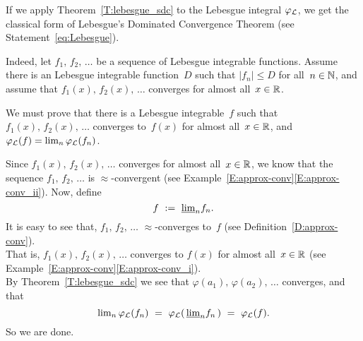 \documentclass[main.tex]{subfiles}
\begin{document}
%
%
\begin{ex}
\label{E:lebesgue}
If we apply Theorem~\ref{T:lebesgue_sdc}
to the Lebesgue integral $\varphi_{\mathcal{L}}$,
we get the classical form of 
Lebesgue's Dominated Convergence Theorem
(see Statement~\eqref{eq:Lebesgue}).

Indeed,
let $f_1,\,f_2,\,\dotsc$ be a sequence of Lebesgue integrable functions.
Assume there is an Lebesgue integrable function~$D$ such that
$|f_n|\leq D$ for all~$n\in\mathbb{N}$,
and assume that $f_1(x),\,f_2(x),\,\dotsc$ converges
for almost all~$x\in\mathbb{R}$.

We must prove that there is a Lebesgue integrable~$f$
such that $f_1(x),\,f_2(x),\,\dotsc$
converges to~$f(x)$ for almost all~$x\in\mathbb{R}$,
and $\varphi_{\mathcal{L}}(f) = \lim_n \varphi_{\mathcal{L}}(f_n)$.

Since 
$f_1(x),\,f_2(x),\,\dotsc$ 
converges for almost all~$x\in \mathbb{R}$,
we know that the sequence $f_1,\,f_2,\,\dotsc$
is $\approx$-convergent
(see Example~\ref{E:approx-conv}\ref{E:approx-conv_ii}).
Now, define
\begin{equation*}
f\ :=\  \smash{\underline{\lim}_{n}}{f_n}.
\end{equation*}
It is easy to see that,
$f_1,\,f_2,\,\dotsc$
$\approx$-converges to~$f$
(see Definition~\ref{D:approx-conv}).\\
That is,
$f_1(x),\,f_2(x),\,\dotsc$
converges to $f(x)$ for almost all~$x\in\mathbb{R}$
(see Example~\ref{E:approx-conv}\ref{E:approx-conv_i}).\\
By Theorem~\ref{T:lebesgue_sdc}
we see that $\varphi(a_1),\,\varphi(a_2),\,\dotsc$
converges, and that
\begin{equation*}
{\lim}_n \,\Lphi(f_n)
\ =\ 
\Lphi(\,\llim{n} f_n\,)
\ =\ 
\Lphi(f).
\end{equation*}
So we are done.
\end{ex}
\end{document}
